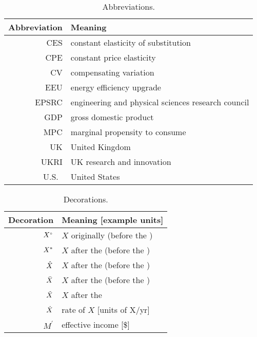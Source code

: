 \begin{table}
\footnotesize
\centering %
\caption{Abbreviations.}
\begin{tabular}{r l}
  \toprule
  Abbreviation & Meaning \\
  \midrule
  CES    & constant elasticity of substitution \\
  CPE    & constant price elasticity \\
  CV     & compensating variation \\
  EEU    & energy efficiency upgrade \\
  EPSRC  & engineering and physical sciences research council \\
  GDP    & gross domestic product \\
  MPC    & marginal propensity to consume \\
  UK     & United Kingdom \\
  UKRI   & UK research and innovation \\
  U.S.\  & United States \\
  \bottomrule
\end{tabular}
\label{tab:abbreviations}
\end{table}



\begin{table}
\footnotesize
\centering %
\caption{Decorations.}
\begin{tabular}{r l}
  \toprule
  Decoration & Meaning [example units] \\
  \midrule
  ${}{X}^{\scriptscriptstyle \circ}$ & $X$ originally (before the \empleffect{}) \\
  ${X}^*$  & $X$ after the \empleffect{} (before the \subeffect{}) \\
  $\hat{X}$ & $X$ after the \subeffect{} (before the \inceffect{}) \\
  $\bar{X}$ & $X$ after the \inceffect{} (before the \macroeffect{}) \\
  $\tilde{X}$ & $X$ after the \macroeffect{} \\
  $\dot{X}$ & rate of $X$ [units of X/yr] \\
  $M^\prime$ & effective income [\$] \\
  \bottomrule
\end{tabular}
\label{tab:decorations}
\end{table}


